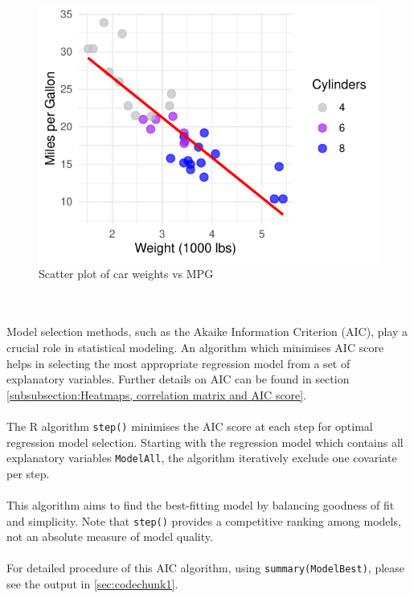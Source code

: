 \documentclass{article}\usepackage[]{graphicx}\usepackage[]{xcolor}
\makeatletter
\def\maxwidth{ %
  \ifdim\Gin@nat@width>\linewidth
    \linewidth
  \else
    \Gin@nat@width
  \fi
}
\newenvironment{knitrout}{}{} %
\makeatother
\begin{document}
\begin{knitrout}\scriptsize
{}\color{fgcolor}\begin{figure}[H]

{\centering \includegraphics[width=\maxwidth]{figure/beamer-scatter-plot-1} 

}

\caption[Scatter plot of car weights vs MPG]{Scatter plot of car weights vs MPG}\label{fig:scatter-plot}
\end{figure}

\end{knitrout}
\\   
\\Model selection methods, such as the Akaike Information Criterion (AIC), play a crucial role in statistical modeling. An algorithm which minimises AIC score helps in selecting the most appropriate regression model from a set of explanatory variables. Further details on AIC can be found in section  \ref{subsubsection:Heatmaps, correlation matrix and AIC score}.
\\  
\\The R algorithm \texttt{step()} minimises the AIC score at each step for optimal regression model selection. Starting with the regression model which contains all explanatory variables \texttt{ModelAll}, the algorithm iteratively exclude one covariate per step. 
\\  
\\This algorithm aims to find the best-fitting model by balancing goodness of fit and simplicity. Note that \texttt{step()} provides a competitive ranking among models, not an absolute measure of model quality.
\\  
\\For detailed procedure of this AIC algorithm, using \texttt{summary(ModelBest)}, please see the output in \ref{sec:codechunk1}.
\end{document}
